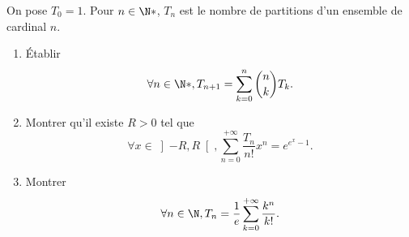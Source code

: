 \begin{enonce}
\begin{exercise}[ID={RMS127 E745},subtitle={Mines-Ponts PSI 2016},tags={}]
On pose $T_0=1$.
Pour $n\in\N*$, $T_n$ est le nombre de partitions d'un ensemble de cardinal $n$.
\begin{enumerate}
  \item Établir
    \begin{equation*}
      \forall n\in\N*, T_{n+1} = \sum_{k=0}^n \binom nk T_k.
    \end{equation*}

  \item Montrer qu'il existe $R>0$ tel que
    \begin{equation*}
      \forall x\in\left]-R,R\right[, \sum_{n=0}^{+\infty} \frac{T_n}{n!} x^n = e^{e^x - 1}.
    \end{equation*}

  \item Montrer
    \begin{equation*}
      \forall n\in\N, T_n = \frac1e \sum_{k=0}^{+\infty} \frac{k^n}{k!}.
    \end{equation*}
    
    
\end{enumerate}
\end{exercise}
\begin{solution}
\end{solution}
\end{enonce}
